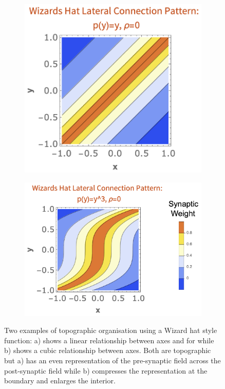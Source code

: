 \begin{figure}[h!]
	\begin{subfigure}{0.4\textwidth}
		\centering
		\includegraphics[width=\textwidth]{images/nft_activity/example-topographicorganisationlinear}
		\caption{}
	\end{subfigure}
	\begin{subfigure}{0.52\textwidth}
		\centering
		\includegraphics[width=\textwidth]{images/nft_activity/example-topgographicorganisationcubic}
		\caption{}
	\end{subfigure}
	\def\c{Two examples of topographic organisation using a Wizard hat style function: a) shows a linear relationship between axes and for while b) shows a cubic relationship between axes. }
	\caption[\c]{\label{fig:topographicexamples}  \c Both are topographic but a) has an even representation of the pre-synaptic field across the post-synaptic field while b) compresses the representation at the boundary and enlarges the interior.}
\end{figure}
